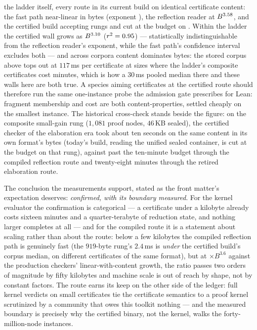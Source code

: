 the ladder itself, every route in its current build on identical
certificate content: the fast path near-linear in bytes (exponent
\GlcRouteExponent), the reflection reader at $B^{3.58}$,
and the certified build accepting \LeanRouteQtslabAcceptCount{} rungs
and cut at the budget on \LeanRouteQtslabCensoredCount. Within the
ladder the certified wall grows as $B^{3.10}$
($r^2=0.95$) --- statistically indistinguishable from
the reflection reader's exponent, while the fast path's confidence
interval excludes both --- and across corpora content dominates
bytes: the stored corpus above tops out at $117$\,ms per certificate
at sizes where the ladder's composite certificates cost minutes,
which is how a $30$\,ms pooled median there and these walls here are
both true. A
species aiming certificates at the certified route should therefore
run the same one-instance probe the admission gate prescribes for
Lean: fragment membership and cost are both content-properties,
settled cheaply on the smallest instance. The historical cross-check
stands beside the figure: on the composite small-gain rung
($1{,}081$ proof nodes, $46$\,KB sealed), the certified checker of
the elaboration era took about ten seconds on the same content in its
own format's bytes (today's build, reading the unified sealed
container, is cut at the budget on that rung), against past the
ten-minute budget through the compiled reflection route and
twenty-eight minutes through the retired elaboration route.

The conclusion the measurements support, stated as the front matter's
expectation deserves: \emph{confirmed, with its boundary measured}.
For the kernel evaluator the confirmation is categorical --- a
certificate under a kilobyte already costs sixteen minutes and a
quarter-terabyte of reduction state, and nothing larger completes at
all --- and for the compiled route it is a statement about scaling
rather than about the route: below a few kilobytes the compiled
reflection path is genuinely fast (the $919$-byte rung's $2.4$\,ms is
\emph{under} the certified build's corpus median, on different
certificates of the same format), but at $\times B^{3.6}$ against the
production checkers' linear-with-content growth, the ratio passes two
orders of magnitude by fifty kilobytes and machine scale is out of
reach by shape, not by constant factors. The route earns its keep on
the other side of the ledger: full kernel verdicts on small
certificates tie the certificate semantics to a proof kernel
scrutinized by a community that owes this toolkit nothing --- and the
measured boundary is precisely why the certified binary, not the
kernel, walks the forty-million-node instances.

